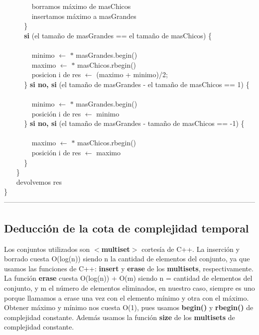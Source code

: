 $~~~~~~~~~~~~~~~~~~$borramos máximo de masChicos  \\
$~~~~~~~~~~~~~~~~~~$insertamos máximo a masGrandes  \\
$~~~~~~~~~~~~~$\} \\
$~~~~~~~~~~~~~$\textbf{si} (el tamaño de masGrandes == el tamaño de masChicos) \{ \\ \\
$~~~~~~~~~~~~~~~~~~$minimo $\leftarrow$ $\ast$ masGrandes.begin() \\
$~~~~~~~~~~~~~~~~~~$maximo $\leftarrow$ $\ast$ masChicos.rbegin() \\
$~~~~~~~~~~~~~~~~~~$posicion i de res $\leftarrow$ (maximo + minimo)/2; \\
$~~~~~~~~~~~~~$\} \textbf{si no, si} (el tamaño de masGrandes - el tamaño de masChicos == 1) \{ \\ \\
$~~~~~~~~~~~~~~~~~~$minimo $\leftarrow$ $\ast$ masGrandes.begin()  \\
$~~~~~~~~~~~~~~~~~~$posición i de res $\leftarrow$  minimo  \\
$~~~~~~~~~~~~~$\} \textbf{si no, si} (el tamaño de masGrandes - tamaño de masChicos == -1) \{ \\ \\
$~~~~~~~~~~~~~~~~~~$maximo $\leftarrow$ $\ast$ masChicos.rbegin() \\
$~~~~~~~~~~~~~~~~~~$posición i de res $\leftarrow$ maximo \\
$~~~~~~~~~~~~~$\} \\
$~~~~~~~~$\} \\
$~~~~~~~~$devolvemos res \\
\} \\
------------------------------------------------------------------------------------------------------------\\

\subsection{Deducción de la cota de complejidad temporal}
Los conjuntos utilizados son  \textbf{$<$multiset$>$} cortesía de C++. La inserción y borrado cuesta O(log(n)) siendo n la cantidad de elementos del conjunto, ya que usamos las funciones de C++: \textbf{insert} y \textbf{erase} de los \textbf{multisets}, respectivamente. La función \textbf{erase} cuesta O(log(n)) + O(m) siendo n = cantidad de elementos del conjunto, y m el número de elementos eliminados, en nuestro caso, siempre es uno porque llamamos a erase una vez con el elemento mínimo y otra con el máximo.\\
Obtener máximo y mínimo nos cuesta O(1), pues usamos \textbf{begin()} y \textbf{rbegin()} de complejidad constante. Además usamos la función \textbf{size} de los \textbf{multisets} de complejidad constante. \\ 

